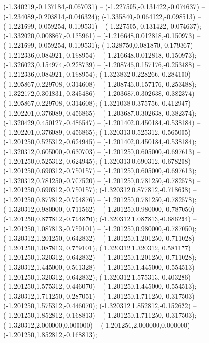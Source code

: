  (-1.340219,-0.137184,-0.067031) -- (-1.227505,-0.131422,-0.074637) -- (-1.234089,-0.203814,-0.046324);
 (-1.335840,-0.064122,-0.098513) -- (-1.221699,-0.059254,-0.109531) -- (-1.227505,-0.131422,-0.074637);
 (-1.332020,0.008867,-0.135961) -- (-1.216648,0.012818,-0.150973) -- (-1.221699,-0.059254,-0.109531);
 (-1.328750,0.081870,-0.179367) -- (-1.212336,0.084921,-0.198954) -- (-1.216648,0.012818,-0.150973);
 (-1.326023,0.154974,-0.228739) -- (-1.208746,0.157176,-0.253488) -- (-1.212336,0.084921,-0.198954);
 (-1.323832,0.228266,-0.284100) -- (-1.205867,0.229708,-0.314608) -- (-1.208746,0.157176,-0.253488);
 (-1.322172,0.301831,-0.345486) -- (-1.203687,0.302638,-0.382374) -- (-1.205867,0.229708,-0.314608);
 (-1.321038,0.375756,-0.412947) -- (-1.202201,0.376089,-0.456865) -- (-1.203687,0.302638,-0.382374);
 (-1.320429,0.450127,-0.486547) -- (-1.201402,0.450184,-0.538184) -- (-1.202201,0.376089,-0.456865);
 (-1.320313,0.525312,-0.565005) -- (-1.201250,0.525312,-0.624945) -- (-1.201402,0.450184,-0.538184);
 (-1.320312,0.605000,-0.630703) -- (-1.201250,0.605000,-0.697613) -- (-1.201250,0.525312,-0.624945);
 (-1.320313,0.690312,-0.678208) -- (-1.201250,0.690312,-0.750157) -- (-1.201250,0.605000,-0.697613);
 (-1.320312,0.781250,-0.707520) -- (-1.201250,0.781250,-0.782578) -- (-1.201250,0.690312,-0.750157);
 (-1.320312,0.877812,-0.718638) -- (-1.201250,0.877812,-0.794876) -- (-1.201250,0.781250,-0.782578);
 (-1.320312,0.980000,-0.711562) -- (-1.201250,0.980000,-0.787050) -- (-1.201250,0.877812,-0.794876);
 (-1.320312,1.087813,-0.686294) -- (-1.201250,1.087813,-0.759101) -- (-1.201250,0.980000,-0.787050);
 (-1.320312,1.201250,-0.642832) -- (-1.201250,1.201250,-0.711028) -- (-1.201250,1.087813,-0.759101);
 (-1.320312,1.320312,-0.581177) -- (-1.201250,1.320312,-0.642832) -- (-1.201250,1.201250,-0.711028);
 (-1.320312,1.445000,-0.501328) -- (-1.201250,1.445000,-0.554513) -- (-1.201250,1.320312,-0.642832);
 (-1.320312,1.575313,-0.403286) -- (-1.201250,1.575312,-0.446070) -- (-1.201250,1.445000,-0.554513);
 (-1.320312,1.711250,-0.287051) -- (-1.201250,1.711250,-0.317503) -- (-1.201250,1.575312,-0.446070);
 (-1.320312,1.852812,-0.152622) -- (-1.201250,1.852812,-0.168813) -- (-1.201250,1.711250,-0.317503);
 (-1.320312,2.000000,0.000000) -- (-1.201250,2.000000,0.000000) -- (-1.201250,1.852812,-0.168813);
